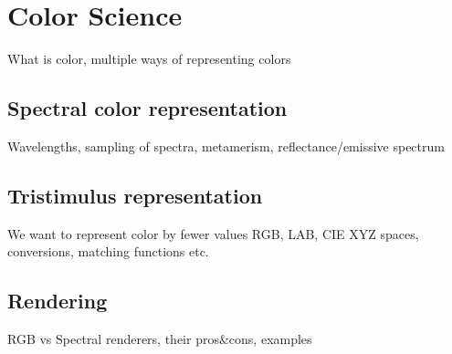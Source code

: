 \chapter{Color Science}

What is color, multiple ways of representing colors

\section{Spectral color representation}
Wavelengths, sampling of spectra, metamerism, reflectance/emissive spectrum 

\section{Tristimulus representation}
We want to represent color by fewer values
RGB, LAB, CIE XYZ spaces, conversions, matching functions etc.

\section{Rendering}
RGB vs Spectral renderers, their pros\&cons, examples
